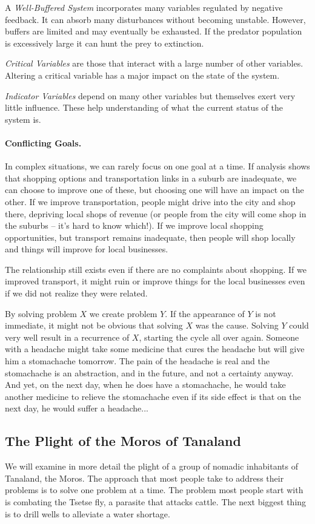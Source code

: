 A \textit{Well-Buffered System} incorporates many variables regulated by negative feedback. It can absorb many disturbances without becoming unstable. However, buffers are limited and may eventually be exhausted. If the predator population is excessively large it can hunt the prey to extinction.

\textit{Critical Variables} are those that interact with a large number of other variables. Altering a critical variable has a major impact on the state of the system.

\textit{Indicator Variables} depend on many other variables but themselves exert very little influence. These help understanding of what the current status of the system is. 

\paragraph{Conflicting Goals.}
In complex situations, we can rarely focus on one goal at a time. If analysis shows that shopping options and transportation links in a suburb are inadequate, we can choose to improve one of these, but choosing one will have an impact on the other. If we improve transportation, people might drive into the city and shop there, depriving local shops of revenue (or people from the city will come shop in the suburbs -- it's hard to know which!). If we improve local shopping opportunities, but transport remains inadequate, then people will shop locally and things will improve for local businesses. 

The relationship still exists even if there are no complaints about shopping. If we improved transport, it might ruin or improve things for the local businesses even if we did not realize they were related.

By solving problem $X$ we create problem $Y$. If the appearance of $Y$ is not immediate, it might not be obvious that solving $X$ was the cause. Solving $Y$ could very well result in a recurrence of $X$, starting the cycle all over again. Someone with a headache might take some medicine that cures the headache but will give him a stomachache tomorrow. The pain of the headache is real and the stomachache is an abstraction, and in the future, and not a certainty anyway. And yet, on the next day, when he does have a stomachache, he would take another medicine to relieve the stomachache even if its side effect is that on the next day, he would suffer a headache...

\subsection*{The Plight of the Moros of Tanaland}
We will examine in more detail the plight of a group of nomadic inhabitants of Tanaland, the Moros. The approach that most people take to address their problems is to solve one problem at a time.  The problem most people start with is combating the Tsetse fly, a parasite  that attacks cattle. The next biggest thing is to drill wells to alleviate a water shortage.

